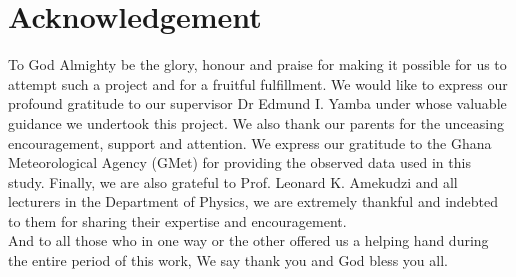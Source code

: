 \label{acknowledgement}
\chapter*{Acknowledgement}



To God Almighty be the glory, honour and praise for making it possible for us to
attempt such a project and for a fruitful fulfillment. We would like to express our profound gratitude to our supervisor Dr Edmund I. Yamba under whose valuable guidance
we undertook this project. We also thank our parents for the unceasing encouragement, support and attention. We express our gratitude to the Ghana Meteorological Agency (GMet) for providing the observed data used in this study. Finally, we are also grateful to Prof. Leonard K. Amekudzi and all lecturers in the Department of Physics, we are extremely thankful and indebted to them for sharing their expertise and encouragement. \\
And to all those who in one way or the other offered us a helping hand during the entire period of this work, We say thank you and God bless you all.

